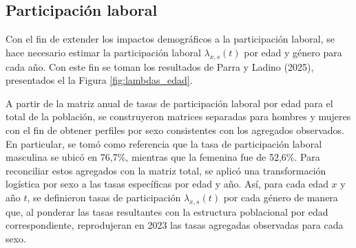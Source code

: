 \documentclass[12pt,a4paper]{article}
\begin{document}

\subsection{Participación laboral}


Con el fin de extender los impactos demográficos a la participación laboral, se hace necesario estimar la participación laboral $\lambda_{x,s}(t)$ por edad y género para cada año. Con este fin se toman los resultados de Parra y Ladino (2025), presentados el la Figura \ref{fig:lambdas_edad}.

A partir de la matriz anual de tasas de participación laboral por edad para el total de la población, se construyeron matrices separadas para hombres y mujeres con el fin de obtener perfiles por sexo consistentes con los agregados observados. En particular, se tomó como referencia que la tasa de participación laboral masculina se ubicó en 76,7\%, mientras que la femenina fue de 52,6\%. Para reconciliar estos agregados con la matriz total, se aplicó una transformación logística por sexo a las tasas específicas por edad y año. Así, para cada edad $x$ y año $t$, se definieron tasas de participación $\lambda_{x,s}(t)$ por cada género %
de manera que, al ponderar las tasas resultantes con la estructura poblacional por edad correspondiente, reprodujeran en 2023 las tasas agregadas observadas para cada sexo.
\end{document}
